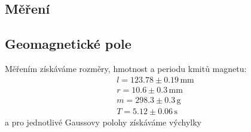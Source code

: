 \documentclass[czech,11pt,a4paper]{article}
\begin{document}
\begin{multicols}{2}
	\section{Měření}
	\subsection{Geomagnetické pole}
	Měřením získáváme rozměry, hmotnost a periodu kmitů magnetu:
	\begin{gather*}
		l = 123.78 \pm 0.19 \,\mathrm{mm}\\ r = 10.6 \pm 0.3 \,\mathrm{mm}\\ m = 298.3 \pm 0.3  \,\mathrm{g} \\ T = 5.12 \pm 0.06 \,\mathrm{s}
	\end{gather*}
	a pro jednotlivé Gaussovy polohy získáváme výchylky
	

\end{multicols}
\end{document}
